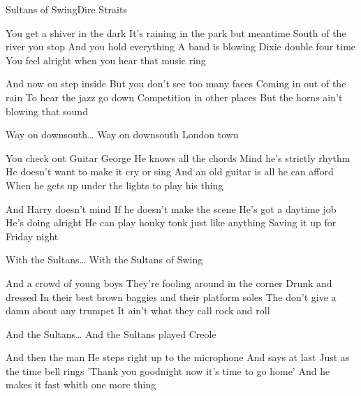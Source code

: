 \begin{Song}{Sultans of Swing}{Dire Straits}
\begin{multicols}{2}

\begin{Verse}
You get a shiver in the dark
It's raining in the park but meantime
South of the river you stop
And you hold everything
A band is blowing Dixie double four time
You feel alright when you hear that music ring
\espaceInterStrophe

And now ou step inside
But you don't see too many faces
Coming in out of the rain
To hear the jazz go down
Competition in other places
But the horns ain't blowing that sound
\end{Verse}
\espaceInterStrophe

\begin{Chorus}
Way on downsouth\dots
Way on downsouth London town
\end{Chorus}
\espaceInterStrophe

\begin{Verse}
You check out Guitar George
He knows all the chords
Mind he's strictly rhythm
He doesn't want to make it cry or sing
And an old guitar is all he can afford
When he gets up under the lights to play his thing
\vfill
\columnbreak

And Harry doesn't mind
If he doesn't make the scene
He's got a daytime job
He's doing alright
He can play honky tonk just like anything
Saving it up for Friday night
\end{Verse}
\espaceInterStrophe

\begin{Chorus}
With the Sultans\dots
With the Sultans of Swing
\end{Chorus}
\espaceInterStrophe

\begin{Verse}
And a crowd of young boys
They're fooling around in the corner
Drunk and dressed
In their best brown baggies and their platform soles
The don't give a damn about any trumpet 
It ain't what they call rock and roll
\end{Verse}
\espaceInterStrophe

\begin{Chorus}
And the Sultans\dots
And the Sultans played Creole
\end{Chorus}
\espaceInterStrophe

\begin{Verse}
And then the man
He steps right up to the microphone
And says at last
Just as the time bell rings
'Thank you goodnight now it's time to go home'
And he makes it fast whith one more thing
\end{Verse}
\espaceInterStrophe


\end{multicols}
\end{Song}
